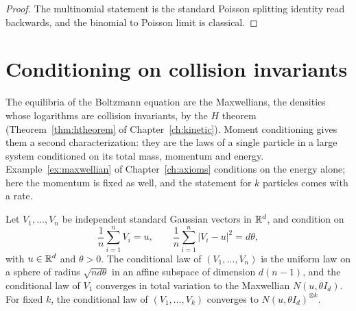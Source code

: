 \begin{proof}
The multinomial statement is the standard Poisson splitting identity read backwards, and the binomial to Poisson limit is classical.
\end{proof}

\section{Conditioning on collision invariants}

The equilibria of the Boltzmann equation are the Maxwellians, the densities whose logarithms are collision invariants, by the $H$ theorem (Theorem~\ref{thm:htheorem} of Chapter~\ref{ch:kinetic}). Moment conditioning gives them a second characterization: they are the laws of a single particle in a large system conditioned on its total mass, momentum and energy. Example~\ref{ex:maxwellian} of Chapter~\ref{ch:axioms} conditions on the energy alone; here the momentum is fixed as well, and the statement for $k$ particles comes with a rate.

\begin{theorem}
\label{thm:maxwellian}
Let $V_1,\dots,V_n$ be independent standard Gaussian vectors in $\mathbb{R}^d$, and condition on
\[
\frac1n\sum_{i=1}^nV_i = u,\qquad\frac1n\sum_{i=1}^n|V_i-u|^2 = d\theta,
\]
with $u\in\mathbb{R}^d$ and $\theta>0$. The conditional law of $(V_1,\dots,V_n)$ is the uniform law on a sphere of radius $\sqrt{nd\theta}$ in an affine subspace of dimension $d(n-1)$, and the conditional law of $V_1$ converges in total variation to the Maxwellian $N(u,\theta I_d)$. For fixed $k$, the conditional law of $(V_1,\dots,V_k)$ converges to $N(u,\theta I_d)^{\otimes k}$.
\end{theorem}

